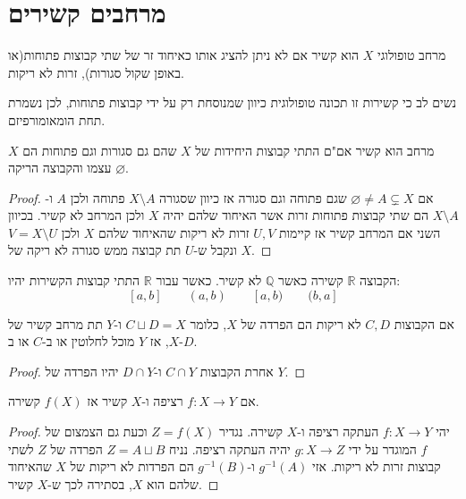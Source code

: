 \documentclass{tstextbook}
\begin{document}
\section{מרחבים קשירים}

\begin{definition}
מרחב טופולוגי \(X\) הוא קשיר אם לא ניתן להציג אותו כאיחוד זר של שתי קבוצות פתוחות(או באופן שקול סגורות), זרות לא ריקות.

\end{definition}
\begin{remark}
נשים לב כי קשירות זו תכונה טופולוגית כיוון שמנוסחת רק על ידי קבוצות פתוחות, לכן נשמרת תחת הומאומורפיזם.

\end{remark}
\begin{proposition}
מרחב הוא קשיר אם"ם התתי קבוצות היחידות של \(X\) שהם גם סגורות וגם פתוחות הם \(X\) עצמו והקבוצה הריקה \(\varnothing\).

\end{proposition}
\begin{proof}
אם \(\varnothing\neq A\subsetneq X\) שגם פתוחה וגם סגורה אז כיוון שסגורה \(X \setminus A\) פתוחה ולכן \(A\) ו-\(X\setminus A\) הם שתי קבוצות פתוחות זרות אשר האיחוד שלהם יהיה \(X\) ולכן המרחב לא קשיר. בכיוון השני אם המרחב קשיר אז קיימות \(U,V\) זרות לא ריקות שהאיחוד שלהם \(X\) ולכן \(V=X\setminus U\) ונקבל ש-\(U\) תת קבוצה ממש סגורה לא ריקה של \(X\).

\end{proof}
\begin{example}
הקבוצה \(\mathbb{R}\) קשירה כאשר \(\mathbb{Q}\) לא קשיר. כאשר עבור \(\mathbb{R}\) התתי קבוצות הקשירות יהיו:
$$[a,b]\qquad (a,b)\qquad [a,b)\qquad (b,a]$$

\end{example}
\begin{lemma}
אם הקבוצות \(C,D\) לא ריקות הם הפרדה של \(X\), כלומר \(C\sqcup D = X\) ו-\(Y\) תת מרחב קשיר של \(X\), אז \(Y\) מוכל לחלוטין או ב-\(C\) או ב-\(D\).

\end{lemma}
\begin{proof}
אחרת הקבוצות \(C\cap Y\) ו-\(D\cap Y\) יהיו הפרדה של \(Y\).

\end{proof}
\begin{proposition}
אם \(f:X\to Y\) רציפה ו-\(X\) קשיר אז \(f(X)\) קשירה.

\end{proposition}
\begin{proof}
יהי \(f:X\to Y\) העתקה רציפה ו-\(X\) קשירה. נגדיר \(Z=f(X)\) וכעת גם הצמצום של \(f\) המוגדר על ידי \(g:X\to Z\) יהיה העתקה רציפה. נניח \(Z=A\sqcup B\) הפרדה של \(Z\) לשתי קבוצות זרות לא ריקות. אזי \(g^{-1}(A)\) ו-\(g^{-1}(B)\) הם הפרדות לא ריקות של \(X\) שהאיחוד שלהם הוא \(X\), בסתירה לכך ש-\(X\) קשיר.

\end{proof}
\end{document}

